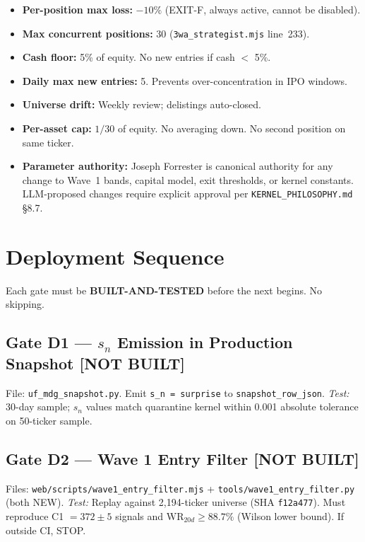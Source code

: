 \documentclass[11pt,a4paper]{article}
\newcommand{\statusnotbuilt}{\textcolor{statusnotbuilt}{\textbf{[NOT BUILT]}}}
\newcommand{\code}[1]{\texttt{\small#1}}
\newcommand{\sha}[1]{\texttt{\footnotesize#1}}
\begin{document}
\begin{itemize}
  \item \textbf{Per-position max loss:} $-10\%$ (EXIT-F, always active, cannot be disabled).
  \item \textbf{Max concurrent positions:} 30 (\texttt{3wa\_strategist.mjs} line~233).
  \item \textbf{Cash floor:} 5\% of equity. No new entries if cash $<$ 5\%.
  \item \textbf{Daily max new entries:} 5. Prevents over-concentration in IPO windows.
  \item \textbf{Universe drift:} Weekly review; delistings auto-closed.
  \item \textbf{Per-asset cap:} $1/30$ of equity. No averaging down. No second position on same ticker.
  \item \textbf{Parameter authority:} Joseph Forrester is canonical authority for any change to Wave~1 bands, capital model, exit thresholds, or kernel constants. LLM-proposed changes require explicit approval per \texttt{KERNEL\_PHILOSOPHY.md} §8.7.
\end{itemize}

\section{Deployment Sequence}

Each gate must be \textbf{BUILT-AND-TESTED} before the next begins. No skipping.

\subsection*{Gate D1 — $s_n$ Emission in Production Snapshot \hfill \statusnotbuilt}
File: \texttt{uf\_mdg\_snapshot.py}. Emit \code{s\_n = surprise} to \code{snapshot\_row\_json}.\newline
\textit{Test:} 30-day sample; $s_n$ values match quarantine kernel within 0.001 absolute tolerance on 50-ticker sample.

\subsection*{Gate D2 — Wave 1 Entry Filter \hfill \statusnotbuilt}
Files: \texttt{web/scripts/wave1\_entry\_filter.mjs} + \texttt{tools/wave1\_entry\_filter.py} (both NEW).\newline
\textit{Test:} Replay against 2,194-ticker universe (SHA \sha{f12a477}). Must reproduce C1 $= 372\pm 5$ signals and $\text{WR}_{20d} \geq 88.7\%$ (Wilson lower bound). If outside CI, STOP.
\end{document}
